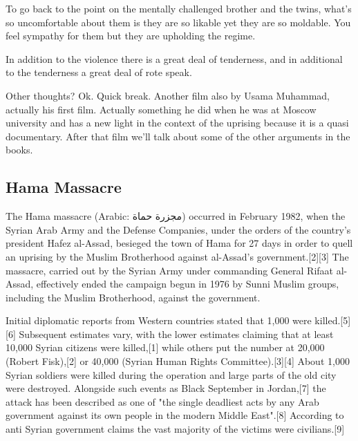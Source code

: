 \documentclass{article}
\begin{document}
\vspace{5mm}

To go back to the point on the mentally challenged brother and the twins, what's so uncomfortable about them is they are so likable yet they are so moldable.  You feel sympathy for them but they are upholding the regime.  

\vspace{5mm}

In addition to the violence there is a great deal of tenderness, and in additional to the tenderness a great deal of rote speak.  

\vspace{5mm}

Other thoughts? Ok.   Quick break.  Another film also by Usama Muhammad, actually his first film.  Actually something he did when he was at Moscow university and has a new light in the context of the uprising because it is a quasi documentary.  After that film we'll talk about some of the other arguments in the books.  

\vspace{5mm}

\subsection{Hama Massacre}

The Hama massacre (Arabic: مجزرة حماة‎) occurred in February 1982, when the Syrian Arab Army and the Defense Companies, under the orders of the country's president Hafez al-Assad, besieged the town of Hama for 27 days in order to quell an uprising by the Muslim Brotherhood against al-Assad's government.[2][3] The massacre, carried out by the Syrian Army under commanding General Rifaat al-Assad, effectively ended the campaign begun in 1976 by Sunni Muslim groups, including the Muslim Brotherhood, against the government.

\vspace{5mm}

Initial diplomatic reports from Western countries stated that 1,000 were killed.[5][6] Subsequent estimates vary, with the lower estimates claiming that at least 10,000 Syrian citizens were killed,[1] while others put the number at 20,000 (Robert Fisk),[2] or 40,000 (Syrian Human Rights Committee).[3][4] About 1,000 Syrian soldiers were killed during the operation and large parts of the old city were destroyed. Alongside such events as Black September in Jordan,[7] the attack has been described as one of "the single deadliest acts by any Arab government against its own people in the modern Middle East".[8] According to anti Syrian government claims the vast majority of the victims were civilians.[9]
\end{document}
